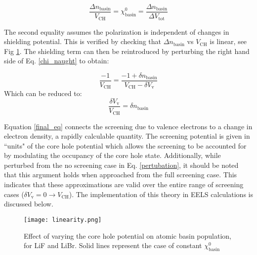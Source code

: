 \begin{equation}
\frac{\Delta n _{\mathrm{basin}}}{V_{\mathrm{CH}}} = \chi^0_{\mathrm{basin}} = \frac{\Delta n _{\mathrm{basin}}}{\Delta V_{\mathrm{tot}}}
\label{chi_naught}
\end{equation}

The second equality assumes the polarization is independent of changes in shielding potential. This is verified by checking that $\Delta n _{\mathrm{basin}}$ vs $V_{\mathrm{CH}}$ is linear, see Fig \ref{linearity}. The shielding term can then be reintroduced by perturbing the right hand side of Eq. \ref{chi_naught} to obtain: 


\begin{equation}
\frac{-1}{V_{\mathrm{CH}}} = \frac{-1+\delta n_{\mathrm{basin}}}{V_{\mathrm{CH}}-\delta V_{\mathrm{v}}}
\label{pertubation}
\end{equation}
Which can be reduced to:
\begin{equation}
\frac{\delta V_{\mathrm{v}}}{V_{\mathrm{CH}}} = \delta n_{\mathrm{basin}}
\label{final_eq}
\end{equation}

Equation \ref{final_eq} connects the screening due to valence electrons to a change in electron density, a rapidly calculable quantity.  The screening potential is given in ``units" of the core hole potential which allows the screening to be accounted for by modulating the occupancy of the core hole state.  Additionally, while perturbed from the no screening case in Eq. \ref{pertubation}, it should be noted that this argument holds when approached from the full screening case.  This indicates that these approximations are valid over the entire range of screening cases ($\delta V_{\mathrm{v}} = 0 \to V_{\mathrm{CH}}$).  The implementation of this theory in EELS calculations is discussed below.  

\begin{figure}
	\centering
	\texttt{[image: linearity.png]}
	\caption{Effect  of varying the core hole potential on atomic basin population, for LiF and LiBr.  Solid lines represent the case of constant $\chi^0_{\mathrm{basin}}$}
	\label{linearity}
	
\end{figure}

